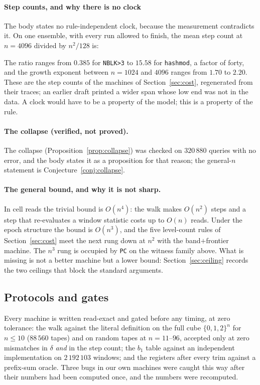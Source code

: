 \paragraph{Step counts, and why there is no clock}\label{app:steps}
The body states no rule-independent clock, because the measurement contradicts it. On one ensemble,
with every run allowed to finish, the mean step count at $n=4096$ divided by $n^{2}/128$ is:

The ratio ranges from $0.385$ for \texttt{NBLK>3} to $15.58$ for \texttt{hashmod}, a factor of
forty, and the growth exponent between $n=1024$ and $4096$ ranges from $1.70$ to $2.20$. These
are the step counts of the machines of Section~\ref{sec:cost}, regenerated from their traces;
an earlier draft printed a wider span whose low end was not in the data. A clock would have to
be a property of the model; this is a property of the rule.

\paragraph{The collapse (verified, not proved).} The collapse (Proposition~\ref{prop:collapse}) was
checked on $320\,880$ queries with no error, and the body states it as a proposition for that
reason; the general-$n$ statement is Conjecture~\ref{conj:collapse}.

\paragraph{The general bound, and why it is not sharp.} In cell reads the trivial bound is $O(n^{4})$:
the walk makes $O(n^{2})$ steps and a step that re-evaluates a window statistic costs up to $O(n)$
reads. Under the epoch structure the bound is $O(n^{3})$, and the five level-count rules of
Section~\ref{sec:cost} meet the next rung down at $n^{2}$ with the band$+$frontier machine. The
$n^{3}$ rung is occupied by \texttt{PC} on the witness family above. What is missing is not a better
machine but a lower bound: Section~\ref{sec:ceiling} records the two ceilings that block
the standard arguments.
\subsection{Protocols and gates}
\label{app:protocols}

Every machine is written read-exact and gated before any timing, at zero tolerance: the walk against
the literal definition on the full cube $\{0,1,2\}^{n}$ for $n\le10$ ($88\,560$ tapes) and on random
tapes at $n=11$--$96$, accepted only at zero mismatches in $\delta$ \emph{and} in the step count; the
$b_1$ table against an independent implementation on $2\,192\,103$ windows; and the registers after
every trim against a prefix-sum oracle. Three bugs in our own machines were caught this way after their
numbers had been computed once, and the numbers were recomputed.

